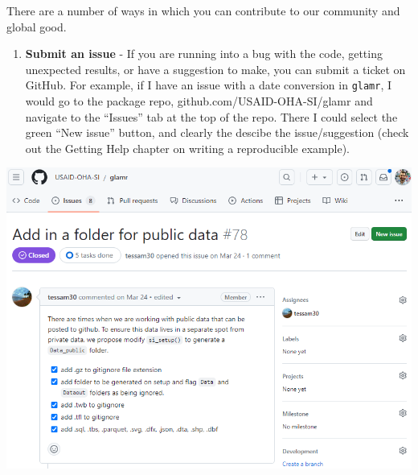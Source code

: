 \documentclass[
  letterpaper,
  DIV=11,
  numbers=noendperiod]{scrreprt}
\providecommand{\tightlist}{%
  \setlength{\itemsep}{0pt}\setlength{\parskip}{0pt}}\usepackage{longtable,booktabs,array}
\begin{document}
There are a number of ways in which you can contribute to our community
and global good.

\begin{enumerate}
\def\labelenumi{\alph{enumi}.}
\tightlist
\item
  \textbf{Submit an issue} - If you are running into a bug with the
  code, getting unexpected results, or have a suggestion to make, you
  can submit a ticket on GitHub. For example, if I have an issue with a
  date conversion in \texttt{glamr}, I would go to the package repo,
  github.com/USAID-OHA-SI/glamr and navigate to the ``Issues'' tab at
  the top of the repo. There I could select the green ``New issue''
  button, and clearly the descibe the issue/suggestion (check out the
  Getting Help chapter on writing a reproducible example).
\end{enumerate}

\includegraphics{./images/image13 - glamr setup.png}
\end{document}
